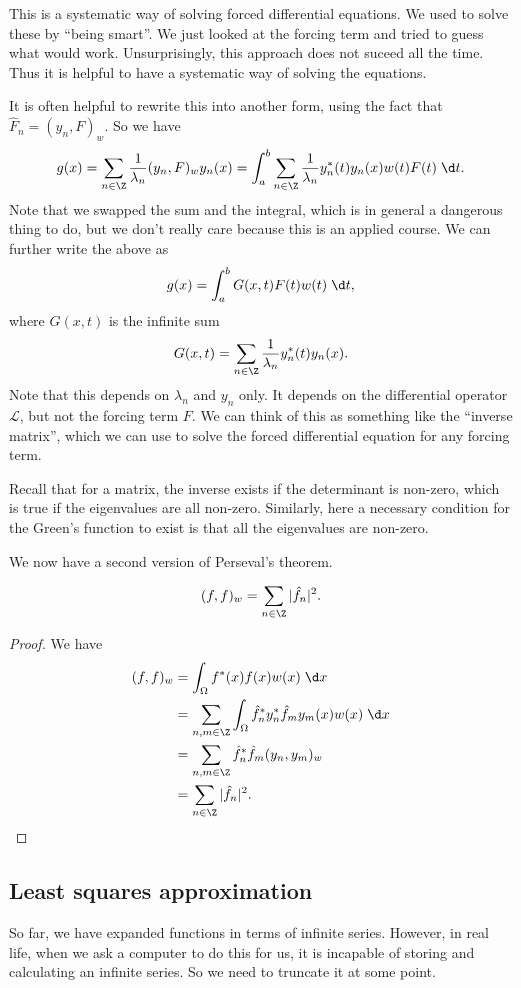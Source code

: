 \documentclass[a4paper]{article}
\begin{document}
This is a systematic way of solving forced differential equations. We used to solve these by ``being smart''. We just looked at the forcing term and tried to guess what would work. Unsurprisingly, this approach does not suceed all the time. Thus it is helpful to have a systematic way of solving the equations.

It is often helpful to rewrite this into another form, using the fact that $\hat{F}_n = (y_n, F)_w$. So we have
\[
  g(x) = \sum_{n \in \Z}\frac{1}{\lambda_n}(y_n, F)_w y_n(x) = \int_a^b \sum_{n \in \Z}\frac{1}{\lambda_n} y_n^*(t) y_n(x) w(t) F(t)\;\d t.
\]
Note that we swapped the sum and the integral, which is in general a dangerous thing to do, but we don't really care because this is an applied course. We can further write the above as
\[
  g(x) = \int_a^b G(x, t) F(t) w(t)\;\d t,
\]
where $G(x, t)$ is the infinite sum
\[
  G(x, t) = \sum_{n \in \Z}\frac{1}{\lambda_n}y_n^*(t) y_n(x).
\]
Note that this depends on $\lambda_n$ and $y_n$ only. It depends on the differential operator $\mathcal{L}$, but not the forcing term $F$. We can think of this as something like the ``inverse matrix'', which we can use to solve the forced differential equation for any forcing term.

Recall that for a matrix, the inverse exists if the determinant is non-zero, which is true if the eigenvalues are all non-zero. Similarly, here a necessary condition for the Green's function to exist is that all the eigenvalues are non-zero.

We now have a second version of Perseval's theorem.
\begin{thm}
  \[
    (f, f)_w = \sum_{n \in \Z}|\hat{f}_n|^2.
  \]
\end{thm}

\begin{proof}
  We have
  \begin{align*}
    (f, f)_w &= \int_\Omega f^*(x) f(x) w(x) \;\d x\\
    &= \sum_{n, m \in \Z}\int_\Omega \hat{f}^*_n y_n^* \hat{f}_m y_m(x)w(x)\;\d x\\
    &= \sum_{n, m\in \Z}\hat{f}^*_n \hat{f}_m (y_n, y_m)_w  \\
    &= \sum_{n \in \Z}|\hat{f}_n|^2.
  \end{align*}
\end{proof}

\subsection{Least squares approximation}
So far, we have expanded functions in terms of infinite series. However, in real life, when we ask a computer to do this for us, it is incapable of storing and calculating an infinite series. So we need to truncate it at some point.
\end{document}
